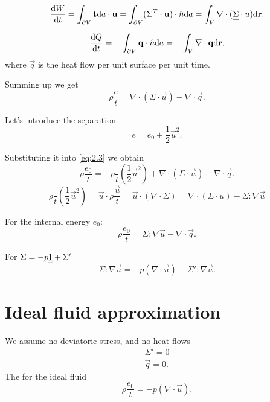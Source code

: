 \documentclass[11pt,oneside]{book}
\theoremstyle{definition} %
\theoremstyle{plain} %
\theoremstyle{remark} %
\theoremstyle{underline}
\begin{document}
  \begin{displaymath}
    \frac{\mathrm{d} W}{\mathrm{d} t} = \int_{\partial V } \mathbf{t} \mathrm{d} a \cdot \mathbf{u} 
    = \int_{\partial V} (\Sigma^T \cdot \mathbf{u} ) \cdot \hat n  \mathrm{d} a 
    = \int_V \nabla \cdot ( \underline{\underline{\Sigma}} \cdot u) \mathrm{d} \mathbf{r}.
  \end{displaymath}

  \begin{displaymath}
    \frac{\mathrm{d} Q}{\mathrm{d} t} = - \int_{\partial V} \mathbf{q} \cdot  \hat n \mathrm{d} a = - \int_V \nabla \cdot \mathbf{q} \mathrm{d} \mathbf{r},
  \end{displaymath}
  where $\vec q$ is the heat flow per unit surface per unit time. %

  Summing up we get
  \begin{equation}
    \rho \dfrac{ e}{t} = \nabla \cdot ( \Sigma \cdot \vec u) - \nabla \cdot \vec q.
    \label{eq:2.3}
  \end{equation}

  Let's introduce the separation 
  \begin{displaymath}
    e = e_0 + \frac{1}{2} \vec u^2.
  \end{displaymath}

  Substituting it into \ref{eq:2.3} we obtain
  \begin{displaymath}
    \rho \dfrac{e_0}{t} = - \rho \dfrac{}{t} \left( \frac{1}{2} \vec u^2 \right) + \nabla \cdot (\Sigma \cdot \vec u ) - \nabla \cdot \vec q.
  \end{displaymath}
  \begin{displaymath}
    \rho \dfrac{}{t} \left( \frac{1}{2} \vec u ^2  \right) 
    = \vec u \cdot \rho \dfrac{\vec u}{t} 
    = \vec u \cdot ( \nabla \cdot \Sigma) 
    = \nabla \cdot ( \Sigma \cdot u) - \Sigma :\nabla \vec u %
  \end{displaymath}
  
  For the internal energy $e_0$:
  \begin{displaymath}
    \rho \dfrac{e_0}{t} = \Sigma : \nabla \vec u - \nabla \cdot \vec q.
  \end{displaymath}
  
  For $\Sigma = - p \underline{\underline{1}} + \Sigma'$
  \begin{displaymath}
    \Sigma : \nabla \vec u = - p ( \nabla \cdot \vec u) + \Sigma' : \nabla \vec u.
  \end{displaymath}
  
  \section{Ideal fluid approximation}
  We assume no deviatoric stress, and no heat flows
  \begin{align*}
    \Sigma' = 0 \\
    \vec q = 0.
  \end{align*}
  The for the ideal fluid
  \begin{displaymath}
    \rho \dfrac{e_0}{t} = - p ( \nabla \cdot \vec u).
  \end{displaymath}
\end{document}
